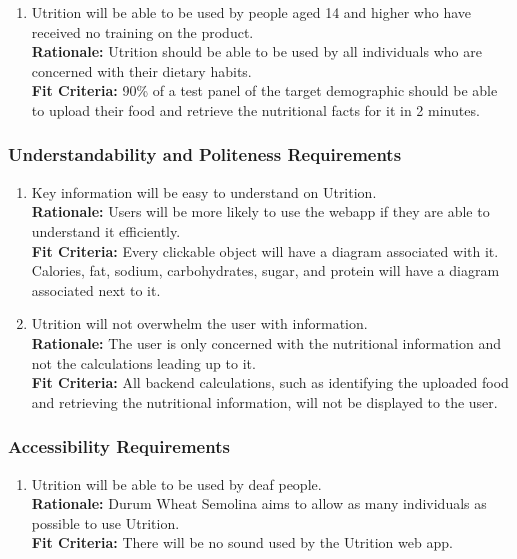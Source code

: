 \documentclass[12pt]{article}
\begin{document}
{\begin{enumerate}[{UH}3. ] 
	\item Utrition will be able to be used by people aged 14 and higher who have received no training on the product.\\
	\textbf{Rationale:} Utrition should be able to be used by all individuals who are concerned with their dietary habits.\\
	\textbf{Fit Criteria:} 90\% of a test panel of the target demographic should be able to upload their food and retrieve the nutritional facts for it in 2 minutes.
\end{enumerate}

\subsubsection{Understandability and Politeness Requirements}

\begin{enumerate}[start=4,label={UH\arabic*.}]
	\item Key information will be easy to understand on Utrition.\\
	\textbf{Rationale:} Users will be more likely to use the webapp if they are able to understand it efficiently.\\
	\textbf{Fit Criteria:} Every clickable object will have a diagram associated with it. Calories, fat, sodium, carbohydrates, sugar, and protein will have a diagram associated next to it.
	\item Utrition will not overwhelm the user with information.\\
	\textbf{Rationale:} The user is only concerned with the nutritional information and not the calculations leading up to it.\\
	\textbf{Fit Criteria:} All backend calculations, such as identifying the uploaded food and retrieving the nutritional information, will not be displayed to the user.
\end{enumerate}

\subsubsection{Accessibility Requirements}

\begin{enumerate}[{UH}6. ] 
	\item Utrition will be able to be used by deaf people.\\
	\textbf{Rationale:} Durum Wheat Semolina aims to allow as many individuals as possible to use Utrition.\\
	\textbf{Fit Criteria:} There will be no sound used by the Utrition web app. 
\end{enumerate}

}
\end{document}
